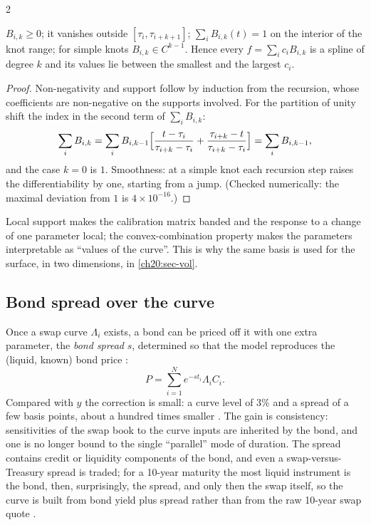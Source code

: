 \begin{paracol}{2}
\begin{proposition}\label{ch20:prop-bspline}
$B_{i,k}\ge0$; it vanishes outside $[\tau_i,\tau_{i+k+1}]$; $\sum_iB_{i,k}(t)=1$ on the interior of the knot range; for simple knots
$B_{i,k}\in C^{k-1}$. Hence every $f=\sum_ic_iB_{i,k}$ is a spline of degree $k$ and its values lie between the smallest and the largest $c_i$.
\end{proposition}
\begin{proof}
Non-negativity and support follow by induction from the recursion, whose coefficients are non-negative on the supports involved. For the partition of unity
shift the index in the second term of $\sum_iB_{i,k}$:
\[
  \sum_iB_{i,k}=\sum_iB_{i,k-1}\Bigl[\frac{t-\tau_i}{\tau_{i+k}-\tau_i}+\frac{\tau_{i+k}-t}{\tau_{i+k}-\tau_i}\Bigr]=\sum_iB_{i,k-1},
\]
and the case $k=0$ is $1$. Smoothness: at a simple knot each recursion step raises the differentiability by one, starting from a jump. (Checked numerically: the maximal deviation from $1$ is $4\times10^{-16}$.)
\end{proof}
Local support makes the calibration matrix banded and the response to a change of one parameter local; the convex-combination
property makes the parameters interpretable as ``values of the curve''. This is why the same basis is used for the surface, in two dimensions,
in \cref{ch20:sec-vol}.

\subsection{Bond spread over the curve}\label{ch20:sec-bondspread}
Once a swap curve $\Lambda_i$ exists, a bond can be priced off it with one extra parameter, the \emph{bond spread} $s$,
determined so that the model reproduces the (liquid, known) bond price :
\begin{equation}\label{ch20:eq-spread}
  P=\sum_{i=1}^Ne^{-st_i}\Lambda_iC_i .
\end{equation}
Compared with $y$ the correction is small: a curve level of $3\%$ and a spread of a few basis points, about a hundred times smaller
. The gain is consistency: sensitivities of the swap book to the curve inputs are inherited by the bond, and one is no longer bound to
the single ``parallel'' mode of duration. The spread contains credit or liquidity components of the bond, and even a
swap-versus-Treasury spread is traded; for a 10-year maturity the most liquid instrument is the bond, then, surprisingly, the spread, and only then the swap
itself, so the curve is built from bond yield plus spread rather than from the raw 10-year swap quote
.


\end{paracol}

